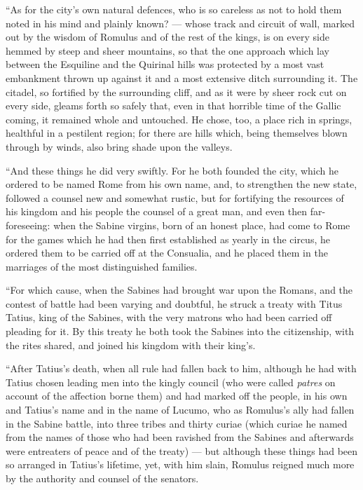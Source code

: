 ``As for the city's own natural defences, who is so careless as not to hold them noted in his mind and plainly known? --- whose track and circuit of wall, marked out by the wisdom of Romulus and of the rest of the kings, is on every side hemmed by steep and sheer mountains, so that the one approach which lay between the Esquiline and the Quirinal hills was protected by a most vast embankment thrown up against it and a most extensive ditch surrounding it. The citadel, so fortified by the surrounding cliff, and as it were by sheer rock cut on every side, gleams forth so safely that, even in that horrible time of the Gallic coming, it remained whole and untouched. He chose, too, a place rich in springs, healthful in a pestilent region; for there are hills which, being themselves blown through by winds, also bring shade upon the valleys.

 ``And these things he did very swiftly. For he both founded the city, which he ordered to be named Rome from his own name, and, to strengthen the new state, followed a counsel new and somewhat rustic, but for fortifying the resources of his kingdom and his people the counsel of a great man, and even then far-foreseeing: when the Sabine virgins, born of an honest place, had come to Rome for the games which he had then first established as yearly in the circus, he ordered them to be carried off at the Consualia, and he placed them in the marriages of the most distinguished families.

 ``For which cause, when the Sabines had brought war upon the Romans, and the contest of battle had been varying and doubtful, he struck a treaty with Titus Tatius, king of the Sabines, with the very matrons who had been carried off pleading for it. By this treaty he both took the Sabines into the citizenship, with the rites shared, and joined his kingdom with their king's.

 ``After Tatius's death, when all rule had fallen back to him, although he had with Tatius chosen leading men into the kingly council (who were called \textit{patres} on account of the affection borne them) and had marked off the people, in his own and Tatius's name and in the name of Lucumo, who as Romulus's ally had fallen in the Sabine battle, into three tribes and thirty curiae (which curiae he named from the names of those who had been ravished from the Sabines and afterwards were entreaters of peace and of the treaty) --- but although these things had been so arranged in Tatius's lifetime, yet, with him slain, Romulus reigned much more by the authority and counsel of the senators.

